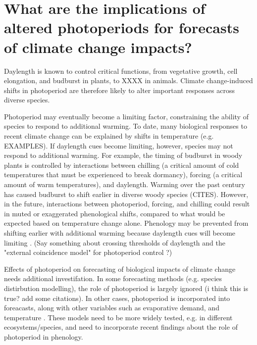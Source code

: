 \documentclass{article}
\begin{document}
\section*{What are the implications of altered photoperiods for forecasts of climate change impacts?}
\par Daylength is known to control critical functions, from vegetative growth, cell elongation, and budburst \citep{Linkosalo:2006aa,erwin1998,sidaway2010, Hsu:2011} in plants, to XXXX in animals. Climate change-induced shifts in photoperiod are therefore likely to alter important responses across diverse species. 
\par Photoperiod may eventually become a limiting factor, constraining the ability of species to respond to additional warming. To date, many biological responses to recent climate change can be explained by shifts in temperature (e.g. EXAMPLES). If daylength cues become limiting, however, species may not respond to additional warming. For example, the timing of budburst in woody plants is controlled by interactions between chilling (a critical amount of cold temperatures that must be experienced to break dormancy), forcing (a critical amount of warm temperatures), and daylength. Warming over the past century has caused budburst to shift earlier in diverse woody species (CITES). However, in the future, interactions between photoperiod, forcing, and chilling could result in muted or exaggerated phenological shifts, compared to what would be expected based on temperature change alone. Phenology may be prevented from shifting earlier with additional warming because daylength cues will become limiting \citep{koerner2010b,vitasse2013, Morin:2010aa}. (Say something about crossing thresholds of daylength and the "external coincidence model" for photoperiod control \citep{bastow2002,kobayashi2007,andres2012,Singh:2017}?)
\par Effects of photoperiod on forecasting of biological impacts of climate change needs additional investifation. In some forecasting methods (e.g. species distirbution modelling), the role of photoperiod is largely ignored (i think this is true? add some citations). In other cases, photoperiod is incorporated into foreacasts, along with other variables such as evaporative demand, and temperature \citep [e.g. ED] []{jolly2005, medvigy2013}. These models need to be more widely tested, e.g. in different ecosystems/species, and need to incorporate recent findings about the role of photoperiod in phenology.     
\end{document}

